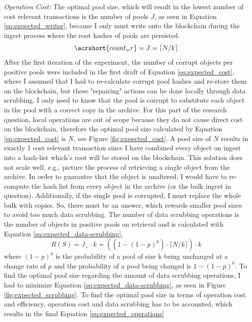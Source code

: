 \textit{Operation Cost:} The optimal pool size, which will result in the lowest number of cost relevant transactions is the number of pools $J$, as seen in Equation \ref{eq:expected_writes}, because I only must write onto the blockchain during the ingest process where the root hashes of pools are persisted.
\begin{equation}\label{eq:expected_writes}
    \acrshort{count_wr} = J = \lceil N/k \rceil
\end{equation}
After the first iteration of the experiment, the number of corrupt objects per positive pools were included in the first draft of Equation \ref{eq:expected_cost}, where I assumed that I had to re-calculate corrupt pool hashes and re-store them on the blockchain, but these "repairing" actions can be done locally through data scrubbing. I only need to know that the pool is corrupt to substitute each object in the pool with a correct copy in the archive. For this part of the research question, local operations are out of scope because they do not cause direct cost on the blockchain, therefore the optimal pool size calculated by Equation \ref{eq:expected_cost} is $N$, see Figure \ref{fig:expected_cost}. A pool size of $N$ results in exactly 1 cost relevant transaction since I have combined every object on ingest into a hash-list which's root will be stored on the blockchain. This solution does not scale well, e.g., picture the process of retrieving a single object from the archive. In order to guarantee that the object is unaltered, I would have to re-compute the hash list from every object in the archive (or the bulk ingest in question). Additionally, if the single pool is corrupted, I must replace the whole bulk with copies. 
So, there must be an answer, which rewards smaller pool sizes to avoid too much data scrubbing. The number of data scrubbing operations is the number of objects in positive pools on retrieval and is calculated with Equation \ref{eq:expected_data-scrubbing},
\begin{equation}\label{eq:expected_data-scrubbing}
    R(S) = J_+ \cdot k = ((1-(1-p)^k)\cdot \lceil N/k \rceil) \cdot k
\end{equation}
where $(1-p)^k$ is the probability of a pool of size k being unchanged at a change rate of $p$ and the probability of a pool being changed is $1-(1-p)^k$. To find the optimal pool size regarding the amount of data scrubbing operations, I had to minimize Equation \ref{eq:expected_data-scrubbing}, as seen in Figure \ref{fig:expected_scrubbing}.
To find the optimal pool size in terms of operation cost and efficiency, operation cost and data scrubbing has to be accounted, which results in the final Equation \ref{eq:expected_operations}
